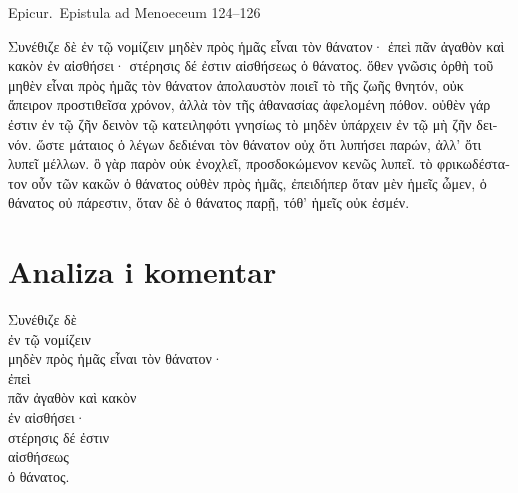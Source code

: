 Epicur.\ Epistula ad Menoeceum 124–126


\medskip


{\large

\begin{greek}

\noindent Συνέθιζε δὲ ἐν τῷ νομίζειν μηδὲν πρὸς ἡμᾶς εἶναι τὸν θάνατον· ἐπεὶ πᾶν ἀγαθὸν καὶ κακὸν ἐν αἰσθήσει· στέρησις δέ ἐστιν αἰσθήσεως ὁ θάνατος. ὅθεν γνῶσις ὀρθὴ τοῦ μηθὲν εἶναι πρὸς ἡμᾶς τὸν θάνατον ἀπολαυστὸν ποιεῖ τὸ τῆς ζωῆς θνητόν, οὐκ ἄπειρον προστιθεῖσα χρόνον, ἀλλὰ τὸν τῆς ἀθανασίας ἀφελομένη πόθον. οὐθὲν γάρ ἐστιν ἐν τῷ ζῆν δεινὸν τῷ κατειληφότι γνησίως τὸ μηδὲν ὑπάρχειν ἐν τῷ μὴ ζῆν δεινόν. ὥστε μάταιος ὁ λέγων δεδιέναι τὸν θάνατον οὐχ ὅτι λυπήσει παρών, ἀλλ' ὅτι λυπεῖ μέλλων. ὃ γὰρ παρὸν οὐκ ἐνοχλεῖ, προσδοκώμενον κενῶς λυπεῖ. τὸ φρικωδέστατον οὖν τῶν κακῶν ὁ θάνατος οὐθὲν πρὸς ἡμᾶς, ἐπειδήπερ ὅταν μὲν ἡμεῖς ὦμεν, ὁ θάνατος οὐ πάρεστιν, ὅταν δὲ ὁ θάνατος παρῇ, τόθ' ἡμεῖς οὐκ ἐσμέν.

\end{greek}

}


\section*{Analiza i komentar}


{\large
\begin{greek}
\noindent Συνέθιζε δὲ \\
\tabto{2em} ἐν τῷ νομίζειν \\
μηδὲν πρὸς ἡμᾶς εἶναι τὸν θάνατον· \\
ἐπεὶ \\
\tabto{2em} πᾶν ἀγαθὸν καὶ κακὸν \\
\tabto{2em} ἐν αἰσθήσει· \\
στέρησις δέ ἐστιν \\
\tabto{2em} αἰσθήσεως \\
ὁ θάνατος.\\

\end{greek}
}


